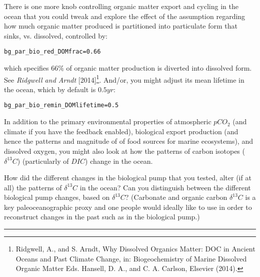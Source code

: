\noindent There is one more knob controlling organic matter export and cycling in the ocean that you could tweak and explore the effect of the assumption regarding how much organic matter produced is partitioned into particulate form that sinks, vs. dissolved, controlled by:
\vspace{-2mm}\small\begin{verbatim}
bg_par_bio_red_DOMfrac=0.66
\end{verbatim}\normalsize\vspace{-2mm}
which specifies 66\% of organic matter production is diverted into dissolved form. See \textit{Ridgwell and Arndt} [2014]\footnote{Ridgwell, A., and S. Arndt, Why Dissolved Organics Matter: DOC in Ancient Oceans and Past Climate Change, in: Biogeochemistry of Marine Dissolved Organic Matter Eds. Hansell, D. A., and C. A. Carlson, Elsevier (2014).}. And/or, you might adjust its mean lifetime in the ocean, which by default is  \(0.5 yr\):
\vspace{-2mm}\small\begin{verbatim}
bg_par_bio_remin_DOMlifetime=0.5
\end{verbatim}\normalsize\vspace{0mm}

\vspace{4mm}

\newpage
%
\noindent In addition to the primary environmental properties of atmospheric \(pCO_{2}\) (and climate if you have the feedback enabled), biological export production (and hence the patterns and magnitude of of food sources for marine ecosystems), and dissolved oxygen, you might also look at how the patterns of carbon isotopes (\(\delta^{13}C\)) (particularly of \(DIC\)) change in the ocean. 

How did the different changes in the biological pump that you tested, alter (if at all) the patterns of \(\delta^{13}C\) in the ocean? Can you distinguish between the different biological pump changes, based on \(\delta^{13}C\)? (Carbonate and organic carbon \(\delta^{13}C\) is a key paleoceanographic proxy and one people would ideally like to use in order to reconstruct changes in the past such as in the biological pump.)

\vspace{1mm}
\noindent\rule{4cm}{0.5pt}
\vspace{2mm}

